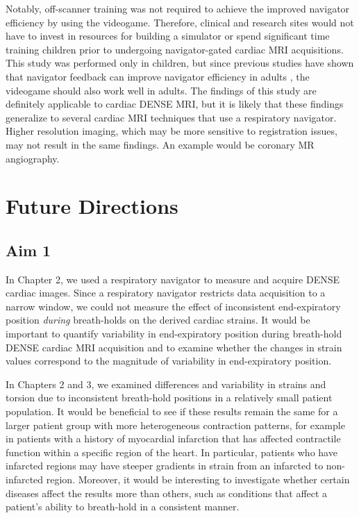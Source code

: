 	Notably, off-scanner training was not required to achieve the improved navigator efficiency by using the videogame. Therefore, clinical and research sites would not have to invest in resources for building a simulator or spend significant time training children prior to undergoing navigator-gated cardiac MRI acquisitions. This study was performed only in children, but since previous studies have shown that navigator feedback can improve navigator efficiency in adults \cite{Feuerlein2009,Liu1993}, the videogame should also work well in adults. The findings of this study are definitely applicable to cardiac DENSE MRI, but it is likely that these findings generalize to several cardiac MRI techniques that use a respiratory navigator. Higher resolution imaging, which may be more sensitive to registration issues, may not result in the same findings. An example would be coronary MR angiography.

\section{Future Directions}

\subsection{Aim 1}
	In Chapter 2, we used a respiratory navigator to measure and acquire DENSE cardiac images. Since a respiratory navigator restricts data acquisition to a narrow window, we could not measure the effect of inconsistent end-expiratory position \textit{during} breath-holds on the derived cardiac strains. It would be important to quantify variability in end-expiratory position during breath-hold DENSE cardiac MRI acquisition and to examine whether the changes in strain values correspond to the magnitude of variability in end-expiratory position.
	
	In Chapters 2 and 3, we examined differences and variability in strains and torsion due to inconsistent breath-hold positions in a relatively small patient population. It would be beneficial to see if these results remain the same for a larger patient group with more heterogeneous contraction patterns, for example in patients with a history of myocardial infarction that has affected contractile function within a specific region of the heart. In particular, patients who have infarcted regions may have steeper gradients in strain from an infarcted to non-infarcted region. Moreover, it would be interesting to investigate whether certain diseases affect the results more than others, such as conditions that affect a patient's ability to breath-hold in a consistent manner.


